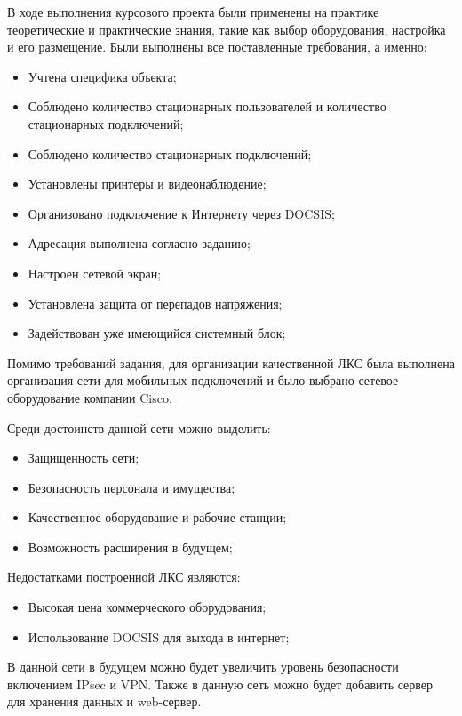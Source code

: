\label{sec:outro}

В ходе выполнения курсового проекта были применены на практике теоретические и практические знания, такие как
выбор оборудования, настройка и его размещение. Были выполнены все поставленные требования, а именно:

\begin{itemize}
  \item Учтена специфика объекта;
  \item Соблюдено количество стационарных пользователей и количество стационарных подключений;
  \item Соблюдено количество стационарных подключений;
  \item Установлены принтеры и видеонаблюдение;
  \item Организовано подключение к Интернету через DOCSIS;
  \item Адресация выполнена согласно заданию;
  \item Настроен сетевой экран;
  \item Установлена защита от перепадов напряжения;
  \item Задействован уже имеющийся системный блок;
\end{itemize}

Помимо требований задания, для организации качественной ЛКС была выполнена 
организация сети для мобильных подключений и было выбрано сетевое оборудование
компании Cisco. 

Среди достоинств данной сети можно выделить:

\begin{itemize}
  \item Защищенность сети;
  \item Безопасность персонала и имущества;
  \item Качественное оборудование и рабочие станции;
  \item Возможность расширения в будущем;
\end{itemize}

Недостатками построенной ЛКС являются: 

\begin{itemize}
  \item Высокая цена коммерческого оборудования;
  \item Использование DOCSIS для выхода в интернет;
\end{itemize}

В данной сети в будущем можно будет увеличить уровень безопасности
включением IPsec и VPN. Также в данную сеть можно будет добавить сервер
для хранения данных и web-сервер.